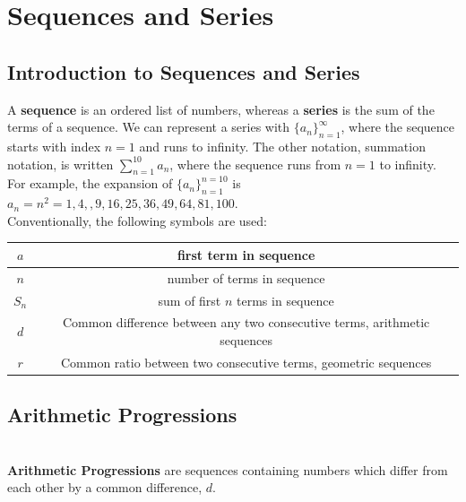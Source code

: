 \section{Sequences and Series}

    \subsection{Introduction to Sequences and Series}
        A \textbf{sequence} is an ordered list of numbers, whereas a \textbf{series} is the
        sum of the terms of a sequence. We can represent a series with $\{a_n\}^\infty_{n=1}$,
        where the sequence starts with index $n=1$ and runs to infinity. The other notation,
        summation notation, is written $\sum^{10}_{n=1}a_n$, where the sequence runs from $n=1$
        to infinity. \\

        \noindent For example, the expansion of
        $\{a_n\}_{n=1}^{n=10}$ is $a_n=n^2=1,4,,9,16,25,36,49,64,81,100$. \\

        \noindent Conventionally, the following symbols are used:

        \begin{center}
            \begin{tabular} {|c|c|}
                \hline
                $a$
                & first term in sequence                                                    \\
                \hline
                $n$
                & number of terms in sequence                                               \\
                \hline
                $S_n$
                & sum of first $n$ terms in sequence                                        \\
                \hline
                $d$
                & Common difference between any two consecutive terms, arithmetic sequences \\
                \hline
                $r$
                & Common ratio between two consecutive terms, geometric sequences           \\
                \hline
            \end{tabular}
        \end{center}



    \subsection{Arithmetic Progressions} \\
        \textbf{Arithmetic Progressions} are sequences containing numbers which differ from each
        other by a common difference, $d$. \\


